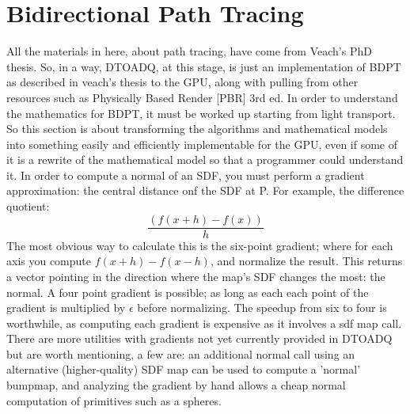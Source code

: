 \documentclass{article}
\begin{document}
  \section{Bidirectional Path Tracing}
    All the materials in here, about path tracing, have come from Veach's PhD
    thesis. So, in a way, DTOADQ, at this stage, is just an implementation of
    BDPT as described in veach's thesis to the GPU, along with pulling from
    other resources such as Physically Based Render [PBR] 3rd ed. In order
    to understand the mathematics for BDPT, it must be worked up starting from
    light transport. So this section is about transforming the algorithms and
    mathematical models into something easily and efficiently implementable for
    the GPU, even if some of it is a rewrite of the mathematical model so that a
    programmer could understand it. In order to compute a normal of an SDF, you
    must perform a gradient approximation: the central distance onf the SDF at
    P. For example, the difference quotient:
      \[\frac{(f(x+h) - f(x))}{h}\]
    The most obvious way to calculate this is the six-point gradient; where for
    each axis you compute $f(x+h) - f(x-h)$, and normalize the result. This
    returns a vector pointing in the direction where the map's SDF changes the
    most: the normal. A four point gradient is possible; as long as each each
    point of the gradient is multiplied by $\epsilon$ before normalizing. The
    speedup from six to four is worthwhile, as computing each gradient is
    expensive as it involves a sdf map call. There are more utilities with
    gradients not yet currently provided in DTOADQ but are worth mentioning, a
    few are: an additional normal call using an alternative (higher-quality) SDF
    map can be used to compute a 'normal' bumpmap, and analyzing the gradient by
    hand allows a cheap normal computation of primitives such as a spheres.
  
\end{document}
